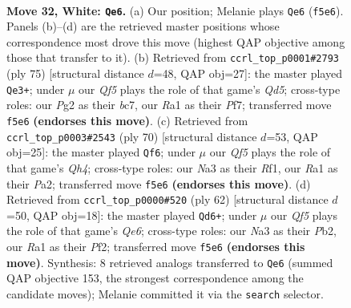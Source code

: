 \documentclass[11pt]{article}
\begin{document}
\clearpage

\begin{figure}[p]\centering
\begin{subfigure}{0.46\textwidth}\centering
\resizebox{\linewidth}{!}{%
\newchessgame
\chessboard[
  setfen={1rr5/6kp/1p6/p4Q2/7P/N7/PP3PP1/R5K1 w - - 1 32},
  showmover=false,
  pgfstyle=straightmove, color=movearrow, markmove={f5-e6}
]}
\caption{}
\end{subfigure}\hfill
\begin{subfigure}{0.46\textwidth}\centering
\resizebox{\linewidth}{!}{%
\newchessgame
\chessboard[
  setfen={6k1/ppB2pp1/7p/8/P2q4/6PP/8/R1R1K3 b - - 19 38},
  showmover=false,
  pgfstyle=straightmove, color=movearrow, markmove={d4-e3}
]}
\caption{}
\end{subfigure}
\\[4pt]
\begin{subfigure}{0.46\textwidth}\centering
\resizebox{\linewidth}{!}{%
\newchessgame
\chessboard[
  setfen={8/3kr2p/p5p1/1pq5/7Q/7P/P5P1/5R1K w - - 2 36},
  showmover=false,
  pgfstyle=straightmove, color=movearrow, markmove={h4-f6}
]}
\caption{}
\end{subfigure}\hfill
\begin{subfigure}{0.46\textwidth}\centering
\resizebox{\linewidth}{!}{%
\newchessgame
\chessboard[
  setfen={2rk3r/6b1/4Q2p/3p2p1/P7/8/1P3PPP/6K1 w - - 4 32},
  showmover=false,
  pgfstyle=straightmove, color=movearrow, markmove={e6-d6}
]}
\caption{}
\end{subfigure}
\caption{\textbf{Move 32, White: \texttt{Qe6}.} (a) Our position; Melanie plays \texttt{Qe6} (\texttt{f5e6}). Panels (b)--(d) are the retrieved master positions whose correspondence most drove this move (highest QAP objective among those that transfer to it). (b) Retrieved from \texttt{ccrl\_top\_p0001\#2793} (ply 75) [structural distance $d$=48, QAP obj=27]: the master played \texttt{Qe3+}; under $\mu$ our \emph{Qf5} plays the role of that game's \emph{Qd5}; cross-type roles: our \emph{P}g2 as their \emph{b}c7, our \emph{R}a1 as their \emph{P}f7; transferred move \texttt{f5e6} \textbf{(endorses this move)}. (c) Retrieved from \texttt{ccrl\_top\_p0003\#2543} (ply 70) [structural distance $d$=53, QAP obj=25]: the master played \texttt{Qf6}; under $\mu$ our \emph{Qf5} plays the role of that game's \emph{Qh4}; cross-type roles: our \emph{N}a3 as their \emph{R}f1, our \emph{R}a1 as their \emph{P}a2; transferred move \texttt{f5e6} \textbf{(endorses this move)}. (d) Retrieved from \texttt{ccrl\_top\_p0000\#520} (ply 62) [structural distance $d$=50, QAP obj=18]: the master played \texttt{Qd6+}; under $\mu$ our \emph{Qf5} plays the role of that game's \emph{Qe6}; cross-type roles: our \emph{N}a3 as their \emph{P}b2, our \emph{R}a1 as their \emph{P}f2; transferred move \texttt{f5e6} \textbf{(endorses this move)}. Synthesis: 8 retrieved analogs transferred to \texttt{Qe6} (summed QAP objective 153, the strongest correspondence among the candidate moves); Melanie committed it via the \texttt{search} selector.}
\label{fig:thought-m62}
\end{figure}
\end{document}

